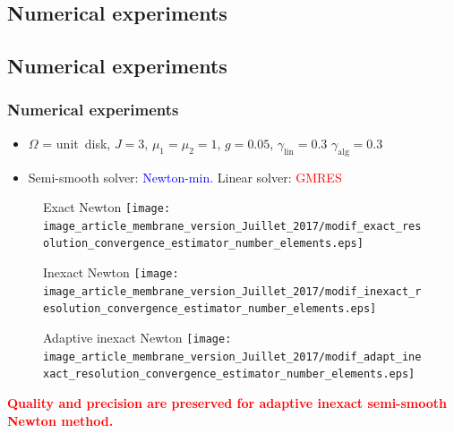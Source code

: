 \documentclass[10 pt]{beamer}
\begin{document}
\begin{frame}
\section{Numerical experiments}
\subsection{Numerical experiments}

\frametitle{Numerical experiments}

\begin{itemize}
\item
$\Omega$ = \mbox{unit disk}, $J = 3$, $\mu_1= \mu_2 = 1$, $g = 0.05$, $\gamma_{\mathrm{lin}}=0.3$ $\gamma_{\mathrm{alg}}=0.3$
\item 
Semi-smooth solver: \textcolor{blue}{Newton-min}. Linear solver: \textcolor{red}{GMRES}
\end{itemize}


\begin{figure}
\begin{minipage}[c]{.33\linewidth}
   \centering
   Exact Newton
\texttt{[image: image\_article\_membrane\_version\_Juillet\_2017/modif\_exact\_resolution\_convergence\_estimator\_number\_elements.eps]}    
\end{minipage}\hfill
\begin{minipage}[c]{.33\linewidth}
   \centering
   Inexact Newton
\texttt{[image: image\_article\_membrane\_version\_Juillet\_2017/modif\_inexact\_resolution\_convergence\_estimator\_number\_elements.eps]}    
\end{minipage}\hfill
\begin{minipage}[c]{.33\linewidth}
   \centering
   Adaptive inexact Newton
\texttt{[image: image\_article\_membrane\_version\_Juillet\_2017/modif\_adapt\_inexact\_resolution\_convergence\_estimator\_number\_elements.eps]}     
\end{minipage}
\end{figure}

\textcolor{red}{\textbf{Quality and precision are preserved for adaptive inexact semi-smooth Newton method.}}


\end{frame}
\end{document}
